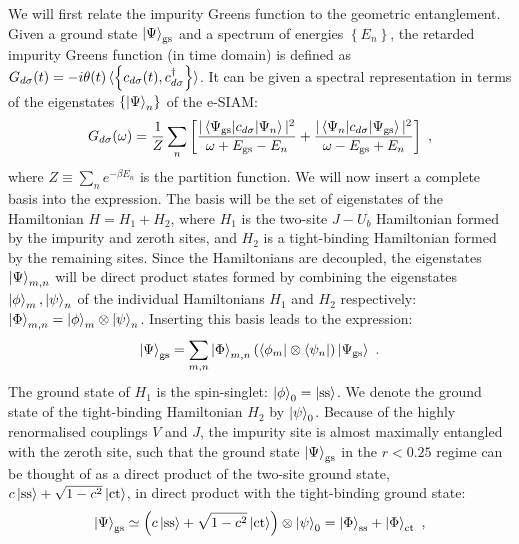 We will first relate the impurity Greens function to the geometric entanglement. Given a ground state \(\ket{\Psi}_\text{gs}\) and a spectrum of energies \(\left\{ E_n \right\} \), the retarded impurity Greens function (in time domain) is defined as \(G_{d\sigma}(t) = -i\theta(t)\braket{\left\{c_{d\sigma}(t),c^\dagger_{d\sigma}\right\}}\). It can be given a spectral representation in terms of the eigenstates \(\left\{\ket{\Psi}_n\right\}\) of the e-SIAM:
\begin{eqnarray}
	\label{green_spectral}
	G_{d\sigma}(\omega) = \frac{1}{Z}\sum_n \left[ \frac{|\braket{\Psi_\text{gs} | c_{d\sigma} | \Psi_n}|^2}{\omega + E_\text{gs} - E_n} + \frac{|\braket{\Psi_n | c_{d\sigma} | \Psi_\text{gs}}|^2}{\omega - E_\text{gs} + E_n}\right] ~,
\end{eqnarray}
where \(Z \equiv \sum_n e^{-\beta E_n}\) is the partition function.
We will now insert a complete basis into the expression. The basis will be the set of eigenstates of the Hamiltonian  \(H = H_1 + H_2\), where \(H_1\) is the two-site \(J-U_b\) Hamiltonian formed by the impurity and zeroth sites, and \(H_2\) is a tight-binding Hamiltonian formed by the remaining sites. Since the Hamiltonians are decoupled, the eigenstates \(\ket{\Psi}_{m,n}\) will be direct product states formed by combining the eigenstates \(\ket{\phi}_m,\ket{\psi}_n\) of the individual Hamiltonians \(H_1\) and \(H_2\) respectively: \(\ket{\Phi}_{m,n} = \ket{\phi}_m\otimes\ket{\psi}_n\). Inserting this basis leads to the expression:
\begin{eqnarray}
	\label{summation}
	\ket{\Psi}_\text{gs} = \sum_{m,n} \ket{\Phi}_{m,n} \left(\bra{\phi_{m}}\otimes\bra{\psi_n}\right)\ket{\Psi_\text{gs}}~.
\end{eqnarray}
The ground state of \(H_1\) is the spin-singlet: \(\ket{\phi}_0 = \ket{\text{ss}}\). We denote the ground state of the tight-binding Hamiltonian \(H_2\) by \(\ket{\psi}_0\). Because of the highly renormalised couplings \(V\) and \(J\), the impurity site is almost maximally entangled with the zeroth site, such that the ground state \(\ket{\Psi}_\text{gs}\) in the \(r < 0.25\) regime can be thought of as a direct product of the two-site ground state, \(c\ket{\text{ss}} + \sqrt{1-c^2}\ket{\text{ct}}\), in direct product with the tight-binding ground state:
\begin{eqnarray}
	\ket{\Psi}_\text{gs} \simeq \left(c\ket{\text{ss}} + \sqrt{1-c^2}\ket{\text{ct}}\right)  \otimes \ket{\psi}_0 = \ket{\Phi}_\text{ss} + \ket{\Phi}_\text{ct}~,
\end{eqnarray}
